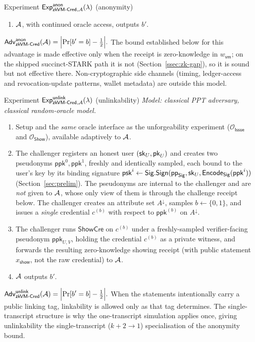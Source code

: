 \begin{gamebox}{Experiment $\mathsf{Exp}^{\mathsf{anon}}_{\mathsf{zkVM\text{-}Cred},\mathcal{A}}(\lambda)$ (anonymity)}
\begin{enumerate}
        \item $\mathcal{A}$, with continued oracle access, outputs $b'$.
    \end{enumerate}
    $\displaystyle
    \mathsf{Adv}^{\mathsf{anon}}_{\mathsf{zkVM\text{-}Cred}}(\mathcal{A})=\Bigl|\Pr[b'=b]-\tfrac12\Bigr|.$ The bound established below for this advantage is made effective only when the receipt is zero-knowledge in $w_{\mathsf{vm}}$; on the shipped succinct-STARK path it is not (Section~\ref{ssec:zk-gap}), so it is sound but not effective there. Non-cryptographic side channels (timing, ledger-access and revocation-update patterns, wallet metadata) are outside this model.
\end{gamebox}

\begin{gamebox}{Experiment $\mathsf{Exp}^{\mathsf{unlink}}_{\mathsf{zkVM\text{-}Cred},\mathcal{A}}(\lambda)$ (unlinkability)}
    \emph{Model: classical PPT adversary, classical random-oracle model.}\par\smallskip
    \begin{enumerate}
        \item Setup and the \emph{same} oracle interface as the unforgeability experiment ($\mathcal O_{\mathsf{Issue}}$ and $\mathcal O_{\mathsf{Show}}$), available adaptively to $\mathcal{A}$.
        \item The challenger registers an honest user $(\mathsf{sk}_U,\mathsf{pk}_U)$ and creates two pseudonyms $\mathsf{ppk}^0,\mathsf{ppk}^1$, freshly and identically sampled, each bound to the user's key by its binding signature $\mathsf{psk}^i\leftarrow\mathsf{Sig}.\mathsf{Sign}(\mathsf{pp}_{\mathsf{Sig}},\mathsf{sk}_U,\mathsf{Encode}_{\mathsf{Sig}}(\mathsf{ppk}^i))$ (Section~\ref{sec:prelim}). The pseudonyms are internal to the challenger and are \emph{not} given to $\mathcal{A}$, whose only view of them is through the challenge receipt below. The challenger creates an attribute set $A^\downarrow$, samples $b\leftarrow\{0,1\}$, and issues a \emph{single} credential $c^{(b)}$ with respect to $\mathsf{ppk}^{(b)}$ on $A^\downarrow$.
        \item The challenger runs $\mathsf{ShowCre}$ on $c^{(b)}$ under a freshly-sampled verifier-facing pseudonym $\mathsf{ppk}_{U,V}$, holding the credential $c^{(b)}$ as a private witness, and forwards the resulting zero-knowledge showing receipt (with public statement $x_{\mathsf{show}}$, not the raw credential) to $\mathcal{A}$.
        \item $\mathcal{A}$ outputs $b'$.
    \end{enumerate}
    $\displaystyle
    \mathsf{Adv}^{\mathsf{unlink}}_{\mathsf{zkVM\text{-}Cred}}(\mathcal{A})=\Bigl|\Pr[b'=b]-\tfrac12\Bigr|.$ When the statements intentionally carry a public linking tag, linkability is allowed only as that tag determines. The single-transcript structure is why the one-transcript simulation applies once, giving unlinkability the single-transcript ($k{+}2\to1$) specialisation of the anonymity bound.
\end{gamebox}


